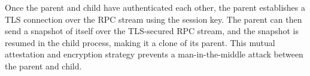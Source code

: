 Once the parent and child have authenticated each other, the parent establishes a TLS connection over the RPC stream using the session key.
The parent can then send a snapshot of itself over
the TLS-secured RPC stream, and the snapshot is resumed in the child process, making it a clone of its parent.
This mutual attestation and encryption strategy
prevents a man-in-the-middle attack between the parent and child.








